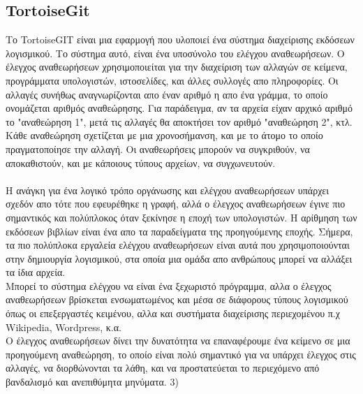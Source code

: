 \subsection{TortoiseGit}
Το TortoiseGIT είναι μια εφαρμογή που υλοποιεί ένα σύστημα διαχείρισης εκδόσεων λογισμικού. Το σύστημα αυτό, είναι ένα υποσύνολο του ελέγχου αναθεωρήσεων. Ο έλεγχος αναθεωρήσεων χρησιμοποιείται για την διαχείριση των αλλαγών σε κείμενα, προγράμματα υπολογιστών, ιστοσελίδες, και άλλες συλλογές απο πληροφορίες. Οι αλλαγές συνήθως αναγνωρίζονται απο έναν αριθμό η απο ένα γράμμα, το οποίο ονομάζεται αριθμός αναθεώρησης. Για παράδειγμα, αν τα αρχεία είχαν αρχικό αριθμό το "αναθεώρηση 1", μετά τις αλλαγές θα αποκτήσει τον αριθμό "αναθεώρηση 2", κτλ. Κάθε αναθεώρηση σχετίζεται με μια χρονοσήμανση, και με το άτομο το οποίο πραγματοποίησε την αλλαγή. Οι αναθεωρήσεις μπορούν να συγκριθούν, να αποκαθιστούν, και με κάποιους τύπους αρχείων, να συγχωνευτούν.\\
\\
Η ανάγκη για ένα λογικό τρόπο οργάνωσης και ελέγχου αναθεωρήσεων υπάρχει σχεδόν απο τότε που εφευρέθηκε η γραφή, αλλά ο έλεγχος αναθεωρήσεων έγινε πιο σημαντικός και πολύπλοκος όταν ξεκίνησε η εποχή των υπολογιστών. Η αρίθμηση των εκδόσεων βιβλίων είναι ένα απο τα παραδείγματα της προηγούμενης εποχής. Σήμερα, τα πιο πολύπλοκα εργαλεία ελέγχου αναθεωρήσεων είναι αυτά που χρησιμοποιούνται στην δημιουργία λογισμικού, στα οποία μια ομάδα απο ανθρώπους μπορεί να αλλάξει τα ίδια αρχεία.\\
Μπορεί το σύστημα ελέγχου να είναι ένα ξεχωριστό πρόγραμμα, αλλα ο έλεγχος αναθεωρήσεων βρίσκεται ενσωματωμένος και μέσα σε διάφορους τύπους λογισμικού όπως οι επεξεργαστές κειμένου, αλλα και συστήματα διαχείρισης περιεχομένου
π.χ Wikipedia, Wordpress, κ.α.\\
Ο έλεγχος αναθεωρήσεων δίνει την δυνατότητα να επαναφέρουμε ένα κείμενο σε μια προηγούμενη αναθεώρηση, το οποίο είναι πολύ σημαντικό για να υπάρχει έλεγχος στις αλλαγές, να διορθώνονται τα λάθη, και να προστατεύεται το περιεχόμενο από βανδαλισμό και ανεπιθύμητα μηνύματα.
3) 